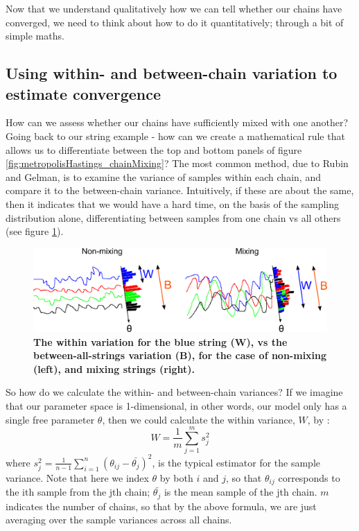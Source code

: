 \documentclass[11pt,fullpage]{book}
\begin{document}
Now that we understand qualitatively how we can tell whether our chains have converged, we need to think about how to do it quantitatively; through a bit of simple maths.

\subsection{Using within- and between-chain variation to estimate convergence}
How can we assess whether our chains have sufficiently mixed with one another? Going back to our string example - how can we create a mathematical rule that allows us to differentiate between the top and bottom panels of figure \ref{fig:metropolisHastings_chainMixing}? The most common method, due to Rubin and Gelman, is to examine the variance of samples within each chain, and compare it to the between-chain variance. Intuitively, if these are about the same, then it indicates that we would have a hard time, on the basis of the sampling distribution alone, differentiating between samples from one chain vs all others (see figure \ref{fig:metropolisHastings_betweenWithinVarianceString}).

\begin{figure}
\centerline{\includegraphics[width=1\textwidth]{metropolisHastings_betweenWithinVarianceString.pdf}}
\caption{\textbf{The within variation for the blue string (W), vs the between-all-strings variation (B), for the case of non-mixing (left), and mixing strings (right).}}\label{fig:metropolisHastings_betweenWithinVarianceString}
\end{figure}

So how do we calculate the within- and between-chain variances? If we imagine that our parameter space is 1-dimensional, in other words, our model only has a single free parameter $\theta$, then we could calculate the within variance, $W$, by \cite{gelman2013bayesian}:
%
\begin{equation}
W = \frac{1}{m}\sum\limits_{j=1}^{m} s_j^2
\end{equation}
%
where $s_j^2=\frac{1}{n-1}\sum\limits_{i=1}^{n} (\theta_{ij} - \bar{\theta_j})^2$, is the typical estimator for the sample variance. Note that here we index $\theta$ by both $i$ and $j$, so that $\theta_{ij}$ corresponds to the ith sample from the jth chain; $\bar{\theta_j}$ is the mean sample of the jth chain. $m$ indicates the number of chains, so that by the above formula, we are just averaging over the sample variances across all chains. 
\end{document}
